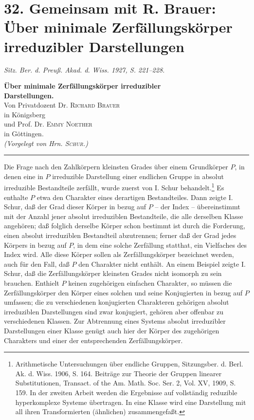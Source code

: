 \section*{32. Gemeinsam mit R. Brauer: Über minimale Zerfällungskörper irreduzibler Darstellungen}
\emph{Sitz. Ber. d. Preuß. Akad. d. Wiss. 1927, S. 221--228.}

\begin{center}
{\Large\bfseries Über minimale Zerfällungskörper irreduzibler\\
Darstellungen.}\\[1.0em]
Von Privatdozent Dr. \textsc{Richard Brauer}\\
in Königsberg\\
und Prof. Dr. \textsc{Emmy Noether}\\
in Göttingen.\\[0.8em]
\emph{(Vorgelegt von Hrn. \textsc{Schur}.)}\\[0.5em]
\rule{4em}{0.4pt}
\end{center}

Die Frage nach den Zahlkörpern kleinsten Grades über einem Grundkörper $P$, in denen eine in $P$ irreduzible Darstellung einer endlichen Gruppe in absolut irreduzible Bestandteile zerfällt, wurde zuerst von I. Schur behandelt.\footnote{Arithmetische Untersuchungen über endliche Gruppen, Sitzungsber. d. Berl. Ak. d. Wiss. 1906, S. 164. Beiträge zur Theorie der Gruppen linearer Substitutionen, Transact. of the Am. Math. Soc. Ser. 2, Vol. XV, 1909, S. 159. In der zweiten Arbeit werden die Ergebnisse auf vollständig reduzible hyperkomplexe Systeme übertragen. In eine Klasse wird eine Darstellung mit all ihren Transformierten (ähnlichen) zusammengefaßt.} Es enthalte $P$ etwa den Charakter eines derartigen Bestandteiles. Dann zeigte I. Schur, daß der Grad dieser Körper in bezug auf $P$ -- der Index -- übereinstimmt mit der Anzahl jener absolut irreduziblen Bestandteile, die alle derselben Klasse angehören; daß folglich derselbe Körper schon bestimmt ist durch die Forderung, einen absolut irreduziblen Bestandteil abzutrennen; ferner daß der Grad jedes Körpers in bezug auf $P$, in dem eine solche Zerfällung statthat, ein Vielfaches des Index wird. Alle diese Körper sollen als Zerfällungskörper bezeichnet werden, auch für den Fall, daß $P$ den Charakter nicht enthält. An einem Beispiel zeigte I. Schur, daß die Zerfällungskörper kleinsten Grades nicht isomorph zu sein brauchen. Enthielt $P$ keinen zugehörigen einfachen Charakter, so müssen die Zerfällungskörper den Körper eines solchen und seine Konjugierten in bezug auf $P$ umfassen; die zu verschiedenen konjugierten Charakteren gehörigen absolut irreduziblen Darstellungen sind zwar konjugiert, gehören aber offenbar zu verschiedenen Klassen. Zur Abtrennung eines Systems absolut irreduzibler Darstellungen einer Klasse genügt auch hier der Körper des zugehörigen Charakters und einer der entsprechenden Zerfällungskörper.

